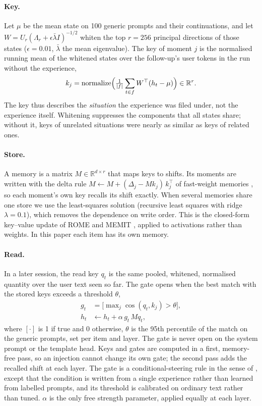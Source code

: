 \documentclass[11pt]{article}
\begin{document}
\paragraph{Key.} Let $\mu$ be the mean state on 100 generic prompts and their continuations, and let $W = U_r(\Lambda_r + \epsilon \bar\lambda I)^{-1/2}$ whiten the top $r{=}256$ principal directions of those states ($\epsilon{=}0.01$, $\bar\lambda$ the mean eigenvalue). The key of moment $j$ is the normalised running mean of the whitened states over the follow-up's user tokens in the run without the experience,
\begin{equation}
  k_j = \operatorname{normalize}\Bigl(\tfrac{1}{|f|}\sum_{t\in f} W^{\top}(h_t - \mu)\Bigr) \in \mathbb{R}^{r}.
\end{equation}
The key thus describes the \emph{situation} the experience was filed under, not the experience itself. Whitening suppresses the components that all states share; without it, keys of unrelated situations were nearly as similar as keys of related ones.

\paragraph{Store.} A memory is a matrix $M \in \mathbb{R}^{d\times r}$ that maps keys to shifts. Its moments are written with the delta rule $M \leftarrow M + (\Delta_j - M k_j)\,k_j^{\top}$ of fast-weight memories \citep{schlag2021linear}, so each moment's own key recalls its shift exactly. When several memories share one store we use the least-squares solution (recursive least squares with ridge $\lambda{=}0.1$), which removes the dependence on write order. This is the closed-form key--value update of ROME and MEMIT \citep{meng2022rome,meng2023memit}, applied to activations rather than weights. In this paper each item has its own memory.

\paragraph{Read.} In a later session, the read key $q_t$ is the same pooled, whitened, normalised quantity over the user text seen so far. The gate opens when the best match with the stored keys exceeds a threshold $\theta$,
\begin{align}
  g_t &= \bigl[\max\nolimits_j \cos(q_t, k_j) > \theta\bigr], \\
  h_t &\leftarrow h_t + \alpha\, g_t\, M q_t ,
\end{align}
where $[\cdot]$ is 1 if true and 0 otherwise, $\theta$ is the 95th percentile of the match on the generic prompts, set per item and layer. The gate is never open on the system prompt or the template head. Keys and gates are computed in a first, memory-free pass, so an injection cannot change its own gate; the second pass adds the recalled shift at each layer. The gate is a conditional-steering rule in the sense of \citet{lee2025cast}, except that the condition is written from a single experience rather than learned from labelled prompts, and its threshold is calibrated on ordinary text rather than tuned. $\alpha$ is the only free strength parameter, applied equally at each layer.
\end{document}
